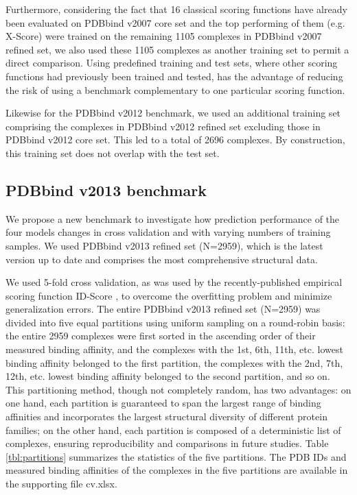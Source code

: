\documentclass[journal=jacsat,manuscript=article]{achemso}
\begin{document}
Furthermore, considering the fact that 16 classical scoring functions have already been evaluated \cite{1313} on PDBbind v2007 core set and the top performing of them (e.g. X-Score) were trained on the remaining 1105 complexes in PDBbind v2007 refined set, we also used these 1105 complexes as another training set to permit a direct comparison. Using predefined training and test sets, where other scoring functions had previously been trained and tested, has the advantage of reducing the risk of using a benchmark complementary to one particular scoring function.

Likewise for the PDBbind v2012 benchmark, we used an additional training set comprising the complexes in PDBbind v2012 refined set excluding those in PDBbind v2012 core set. This led to a total of 2696 complexes. By construction, this training set does not overlap with the test set. %

\subsection{PDBbind v2013 benchmark}

We propose a new benchmark to investigate how prediction performance of the four models changes in cross validation and with varying numbers of training samples. We used PDBbind v2013 refined set (N=2959), which is the latest version up to date and comprises the most comprehensive structural data.

We used 5-fold cross validation, as was used by the recently-published empirical scoring function ID-Score \cite{1305}, to overcome the overfitting problem and minimize generalization errors. The entire PDBbind v2013 refined set (N=2959) was divided into five equal partitions using uniform sampling on a round-robin basis: the entire 2959 complexes were first sorted in the ascending order of their measured binding affinity, and the complexes with the 1st, 6th, 11th, etc. lowest binding affinity belonged to the first partition, the complexes with the 2nd, 7th, 12th, etc. lowest binding affinity belonged to the second partition, and so on. This partitioning method, though not completely random, has two advantages: on one hand, each partition is guaranteed to span the largest range of binding affinities and incorporates the largest structural diversity of different protein families; on the other hand, each partition is composed of a deterministic list of complexes, ensuring reproducibility and comparisons in future studies. Table \ref{tbl:partitions} summarizes the statistics of the five partitions. The PDB IDs and measured binding affinities of the complexes in the five partitions are available in the supporting file cv.xlsx.
\end{document}
